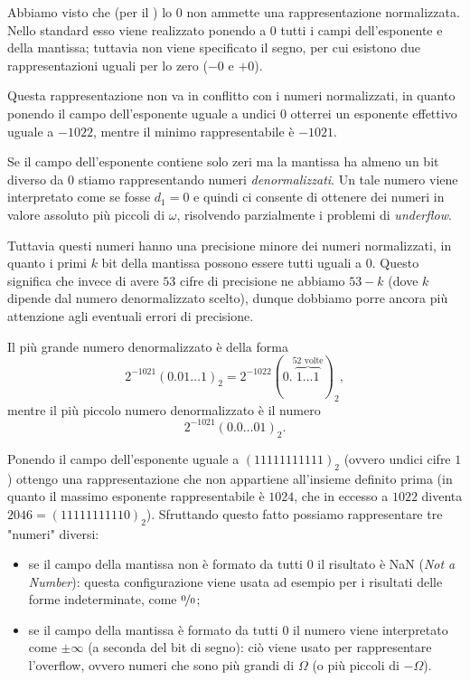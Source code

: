  Abbiamo visto che (per il ) lo $0$ non ammette una rappresentazione normalizzata. Nello standard \IEEE esso viene realizzato ponendo a $0$ tutti i campi dell'esponente e della mantissa; tuttavia non viene specificato il segno, per cui esistono due rappresentazioni uguali per lo zero ($-0$ e $+0$). 

Questa rappresentazione non va in conflitto con i numeri normalizzati, in quanto ponendo il campo dell'esponente uguale a undici $0$ otterrei un esponente effettivo uguale a $-1022$, mentre il minimo rappresentabile è $-1021$. 

 Se il campo dell'esponente contiene solo zeri ma la mantissa ha almeno un bit diverso da $0$ stiamo rappresentando numeri \emph{denormalizzati}. Un tale numero viene interpretato come se fosse $d_1 = 0$ e quindi ci consente di ottenere dei numeri in valore assoluto più piccoli di $\omega$, risolvendo parzialmente i problemi di \emph{underflow}. 

Tuttavia questi numeri hanno una precisione minore dei numeri normalizzati, in quanto i primi $k$ bit della mantissa possono essere tutti uguali a $0$. Questo significa che invece di avere $53$ cifre di precisione ne abbiamo $53 - k$ (dove $k$ dipende dal numero denormalizzato scelto), dunque dobbiamo porre ancora più attenzione agli eventuali errori di precisione.

Il più grande numero denormalizzato è della forma \[
    2^{-1021} (0.01\dots1)_2 = 2^{-1022} (0.\!\!\overbrace{1\dots1}^{52\text{ volte}})_2,
\] mentre il più piccolo numero denormalizzato è il numero \[
    2^{-1021} (0.0\dots01)_2.
\]

 Ponendo il campo dell'esponente uguale a $(11111111111)_2$ (ovvero undici cifre $1$) ottengo una rappresentazione che non appartiene all'insieme definito prima (in quanto il massimo esponente rappresentabile è $1024$, che in eccesso a $1022$ diventa $2046 = (11111111110)_2$). Sfruttando questo fatto possiamo rappresentare tre "numeri" diversi:
\begin{itemize}
    \item se il campo della mantissa non è formato da tutti $0$ il risultato è NaN (\emph{Not a Number}): questa configurazione viene usata ad esempio per i risultati delle forme indeterminate, come $\nicefrac00$;
    \item se il campo della mantissa è formato da tutti $0$ il numero viene interpretato come $\pm\infty$ (a seconda del bit di segno): ciò viene usato per rappresentare l'overflow, ovvero numeri che sono più grandi di $\Omega$ (o più piccoli di $-\Omega$). 
\end{itemize}